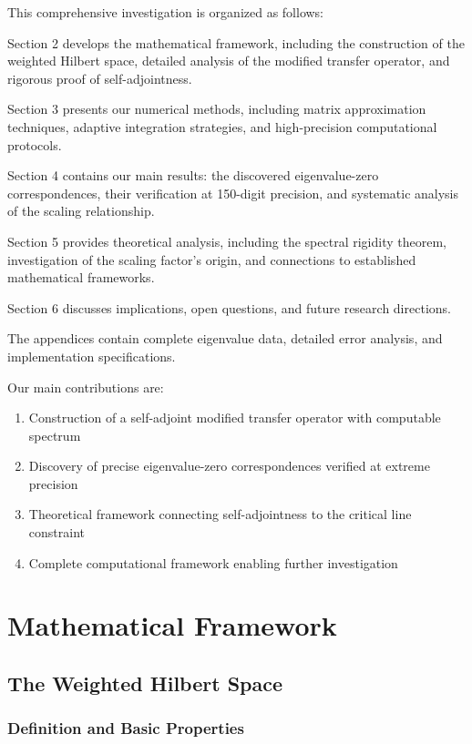 \documentclass[12pt,letterpaper]{article}
\theoremstyle{plain}
\theoremstyle{definition}
\theoremstyle{remark}
\begin{document}
This comprehensive investigation is organized as follows:

Section 2 develops the mathematical framework, including the construction of the weighted Hilbert space, detailed analysis of the modified transfer operator, and rigorous proof of self-adjointness.

Section 3 presents our numerical methods, including matrix approximation techniques, adaptive integration strategies, and high-precision computational protocols.

Section 4 contains our main results: the discovered eigenvalue-zero correspondences, their verification at 150-digit precision, and systematic analysis of the scaling relationship.

Section 5 provides theoretical analysis, including the spectral rigidity theorem, investigation of the scaling factor's origin, and connections to established mathematical frameworks.

Section 6 discusses implications, open questions, and future research directions.

The appendices contain complete eigenvalue data, detailed error analysis, and implementation specifications.

Our main contributions are:
\begin{enumerate}
\item Construction of a self-adjoint modified transfer operator with computable spectrum
\item Discovery of precise eigenvalue-zero correspondences verified at extreme precision
\item Theoretical framework connecting self-adjointness to the critical line constraint
\item Complete computational framework enabling further investigation
\end{enumerate}

\section{Mathematical Framework}

\subsection{The Weighted Hilbert Space}

\subsubsection{Definition and Basic Properties}
\end{document}
